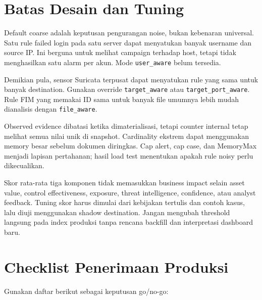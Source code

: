 \documentclass[11pt,a4paper,oneside]{report}
\DeclareRobustCommand{\code}[1]{\nolinkurl{#1}}
\begin{document}
\chapter{Batas Desain dan Tuning}

Default coarse adalah keputusan pengurangan noise, bukan kebenaran universal.
Satu rule failed login pada satu server dapat menyatukan banyak username dan source
IP. Ini berguna untuk melihat campaign terhadap host, tetapi tidak menghasilkan
satu alarm per akun. Mode \code{user\_aware} belum tersedia.

Demikian pula, sensor Suricata terpusat dapat menyatukan rule yang sama untuk banyak
destination. Gunakan override \code{target\_aware} atau
\code{target\_port\_aware}. Rule FIM yang memakai ID sama untuk banyak file umumnya
lebih mudah dianalisis dengan \code{file\_aware}.

Observed evidence dibatasi ketika dimaterialisasi, tetapi counter internal tetap
melihat semua nilai unik di snapshot. Cardinality ekstrem dapat menggunakan memory
besar sebelum dokumen diringkas. Cap alert, cap case, dan MemoryMax menjadi lapisan
pertahanan; hasil load test menentukan apakah rule noisy perlu dikecualikan.

Skor rata-rata tiga komponen tidak memasukkan business impact selain asset value,
control effectiveness, exposure, threat intelligence, confidence, atau analyst
feedback. Tuning skor harus dimulai dari kebijakan tertulis dan contoh kasus, lalu
diuji menggunakan shadow destination. Jangan mengubah threshold langsung pada
index produksi tanpa rencana backfill dan interpretasi dashboard baru.

\chapter{Checklist Penerimaan Produksi}

Gunakan daftar berikut sebagai keputusan go/no-go:
\end{document}
